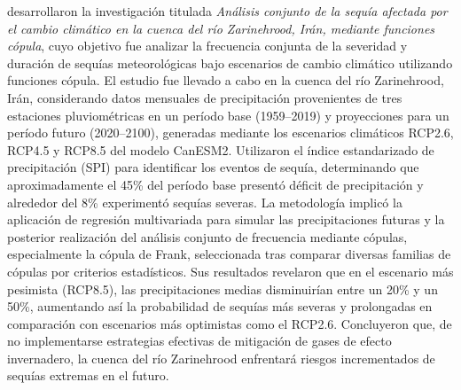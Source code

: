 \textcite{Samadian2024} desarrollaron la investigación titulada \emph{Análisis conjunto de la sequía afectada por el cambio climático en la cuenca del río Zarinehrood, Irán, mediante funciones cópula}, cuyo objetivo fue analizar la frecuencia conjunta de la severidad y duración de sequías meteorológicas bajo escenarios de cambio climático utilizando funciones cópula. El estudio fue llevado a cabo en la cuenca del río Zarinehrood, Irán, considerando datos mensuales de precipitación provenientes de tres estaciones pluviométricas en un período base (1959--2019) y proyecciones para un período futuro (2020--2100), generadas mediante los escenarios climáticos RCP2.6, RCP4.5 y RCP8.5 del modelo CanESM2. Utilizaron el índice estandarizado de precipitación (SPI) para identificar los eventos de sequía, determinando que aproximadamente el 45\% del período base presentó déficit de precipitación y alrededor del 8\% experimentó sequías severas. La metodología implicó la aplicación de regresión multivariada para simular las precipitaciones futuras y la posterior realización del análisis conjunto de frecuencia mediante cópulas, especialmente la cópula de Frank, seleccionada tras comparar diversas familias de cópulas por criterios estadísticos. Sus resultados revelaron que en el escenario más pesimista (RCP8.5), las precipitaciones medias disminuirían entre un 20\% y un 50\%, aumentando así la probabilidad de sequías más severas y prolongadas en comparación con escenarios más optimistas como el RCP2.6. Concluyeron que, de no implementarse estrategias efectivas de mitigación de gases de efecto invernadero, la cuenca del río Zarinehrood enfrentará riesgos incrementados de sequías extremas en el futuro.

